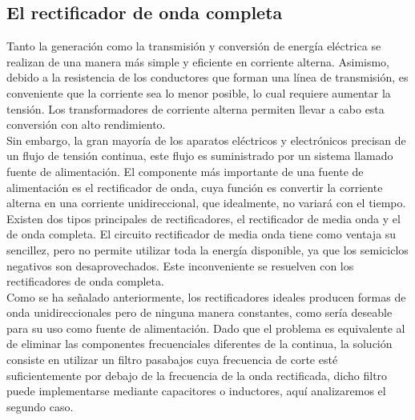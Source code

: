 \documentclass[a4paper,12pt]{article}
\begin{document}
\subsection{El rectificador de onda completa}
\indent Tanto la generación como la transmisión y conversión de energía eléctrica se realizan de una manera más simple y eficiente en corriente alterna. Asimismo, debido a la resistencia de los conductores que forman una línea de transmisión, es conveniente que la corriente sea lo menor posible, lo cual requiere aumentar la tensión. Los transformadores de corriente alterna permiten llevar a cabo esta conversión con alto rendimiento.\\
\indent Sin embargo, la gran mayoría de los aparatos eléctricos y electrónicos precisan de un flujo de tensión continua, este flujo es suministrado por un sistema llamado fuente de alimentación. El componente más importante de una fuente de alimentación es el rectificador de onda, cuya función es convertir la corriente alterna en una corriente unidireccional, que idealmente, no variará con el tiempo.\\
\indent Existen dos tipos principales de rectificadores, el rectificador de media onda y el de onda completa. El circuito rectificador de media onda tiene como ventaja su sencillez, pero no permite utilizar toda la energía disponible, ya que los
semiciclos negativos son desaprovechados. Este inconveniente se resuelven con los rectificadores de onda completa.\\
\indent Como se ha señalado anteriormente, los rectificadores ideales producen formas de onda unidireccionales pero de ninguna manera constantes, como sería deseable para su uso como fuente de alimentación. Dado que el problema es equivalente al de eliminar las componentes frecuenciales diferentes de la continua, la solución consiste en utilizar un filtro pasabajos cuya frecuencia de corte esté suficientemente por debajo de la
frecuencia de la onda rectificada, dicho filtro puede implementarse mediante capacitores o inductores, aquí analizaremos el segundo caso.
\end{document}
